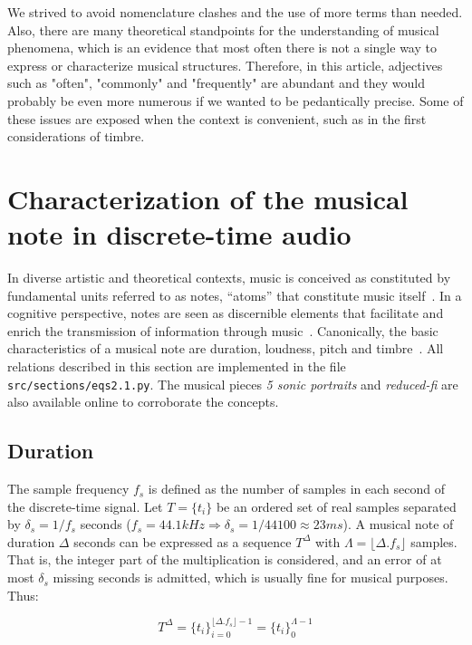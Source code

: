 We strived to avoid nomenclature clashes and the use of more terms than needed.
Also, there are many theoretical standpoints for the understanding of musical phenomena,
which is an evidence that most often there is not a single way to express or characterize musical structures.
Therefore, in this article, adjectives such as "often", "commonly" and "frequently" are abundant and they would probably be even more numerous if we wanted to be pedantically precise.
Some of these issues are exposed when the context is convenient, such as in the first considerations of timbre.

\section{Characterization of the musical note in discrete-time audio} \label{sec:discNote}\label{sec:notaDisc}
In diverse artistic and theoretical contexts, music is conceived as constituted by fundamental units referred to as notes, ``atoms'' that constitute music itself~\cite{Wisnick, Lovelock, Webern}.
In a cognitive perspective, notes are seen as discernible elements that facilitate and enrich the transmission of information through music~\cite{Roederer, Lacerda}.
Canonically, the basic characteristics of a musical note are duration, loudness, pitch and timbre~\cite{Lacerda}.
All relations described in this section are implemented in the file \texttt{src/sections/eqs2.1.py}.
The musical pieces \emph{5 sonic portraits} and \emph{reduced-fi} are also available online to corroborate the concepts.

\subsection{Duration}
The sample frequency $f_s$ is defined as the number of samples in each second of the discrete-time signal. Let $T=\{t_i\}$ be an ordered set of real samples separated by $\delta_s=1/f_s$ seconds ($f_s=44.1kHz \Rightarrow \delta_s=1/44100\approx 23ms$).
A musical note of duration $\Delta$ seconds can be expressed as a sequence $T^{\Delta}$ with $\Lambda = \lfloor \Delta . f_s \rfloor$ samples.
That is, the integer part of the multiplication is considered, and an error of at most $\delta_s$ missing seconds is admitted, which is usually fine for musical purposes. Thus:


\begin{equation}\label{eq:dur}
T^{\Delta}={\{t_i\}}_{i=0}^{\lfloor \Delta . f_s \rfloor -1} = \{t_i\}_0^{\Lambda-1}
\end{equation}

